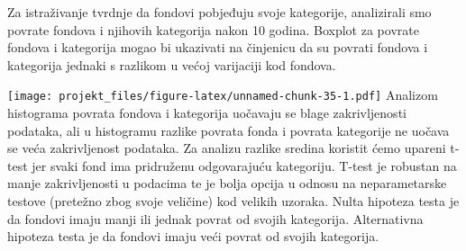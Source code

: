 \documentclass[
]{article}
\newenvironment{Shaded}{\begin{snugshade}}{\end{snugshade}}
\newcommand{\DataTypeTok}[1]{\textcolor[rgb]{0.13,0.29,0.53}{#1}}
\newcommand{\KeywordTok}[1]{\textcolor[rgb]{0.13,0.29,0.53}{\textbf{#1}}}
\newcommand{\NormalTok}[1]{#1}
\newcommand{\OperatorTok}[1]{\textcolor[rgb]{0.81,0.36,0.00}{\textbf{#1}}}
\newcommand{\StringTok}[1]{\textcolor[rgb]{0.31,0.60,0.02}{#1}}
\begin{document}
Za istraživanje tvrdnje da fondovi pobjeđuju svoje kategorije,
analizirali smo povrate fondova i njihovih kategorija nakon 10 godina.
Boxplot za povrate fondova i kategorija mogao bi ukazivati na činjenicu
da su povrati fondova i kategorija jednaki s razlikom u većoj varijaciji
kod fondova.

\begin{Shaded}
\end{Shaded}

\texttt{[image: projekt\_files/figure-latex/unnamed-chunk-35-1.pdf]}
Analizom histograma povrata fondova i kategorija uočavaju se blage
zakrivljenosti podataka, ali u histogramu razlike povrata fonda i
povrata kategorije ne uočava se veća zakrivljenost podataka. Za analizu
razlike sredina koristit ćemo upareni t-test jer svaki fond ima
pridruženu odgovarajuću kategoriju. T-test je robustan na manje
zakrivljenosti u podacima te je bolja opcija u odnosu na neparametarske
testove (pretežno zbog svoje veličine) kod velikih uzoraka. Nulta
hipoteza testa je da fondovi imaju manji ili jednak povrat od svojih
kategorija. Alternativna hipoteza testa je da fondovi imaju veći povrat
od svojih kategorija.

\begin{Shaded}
\end{Shaded}
\end{document}
